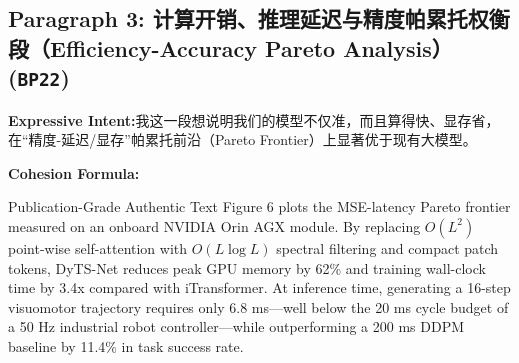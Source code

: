 \subsection*{Paragraph 3: 计算开销、推理延迟与精度帕累托权衡段（Efficiency-Accuracy Pareto Analysis） (\texttt{BP22})}
\noindent\textbf{Expressive Intent:}\enspace 我这一段想说明我们的模型不仅准，而且算得快、显存省，在“精度-延迟/显存”帕累托前沿（Pareto Frontier）上显著优于现有大模型。\par
\noindent\textbf{Cohesion Formula:}\par\vspace{4pt}
\begin{ExampleBox}{Publication-Grade Authentic Text}
Figure 6 plots the MSE-latency Pareto frontier measured on an onboard NVIDIA Orin AGX module. By replacing $O(L^2)$ point-wise self-attention with $O(L \log L)$ spectral filtering and compact patch tokens, DyTS-Net reduces peak GPU memory by 62\% and training wall-clock time by 3.4x compared with iTransformer. At inference time, generating a 16-step visuomotor trajectory requires only 6.8 ms---well below the 20 ms cycle budget of a 50 Hz industrial robot controller---while outperforming a 200 ms DDPM baseline by 11.4\% in task success rate.
\end{ExampleBox}
